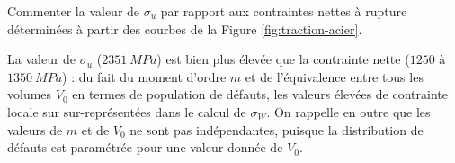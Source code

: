 \begin{questions}
\question Commenter la valeur de $\sigma_u$ par rapport aux contraintes nettes à rupture déterminées à partir
des courbes de la Figure \ref{fig:traction-acier}.
\begin{solution}
La valeur de $\sigma_u$ ($\SI{2351}{MPa}$) est bien plus élevée que la contrainte nette ($1250$ à $\SI{1350}{MPa}$) :
du fait du moment d’ordre $m$ et de l'équivalence entre tous les volumes $V_0$ en termes de population de défauts, les valeurs élevées de contrainte locale sur sur-représentées dans le calcul de $\sigma_W$. On rappelle en outre que les valeurs de $m$ et de $V_0$ ne sont pas indépendantes, puisque la distribution de défauts est paramétrée pour une valeur donnée de $V_0$.
\end{solution}

\end{questions}

